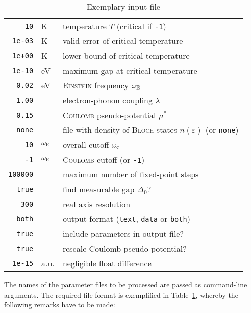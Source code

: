 \documentclass[twocolumn]{article}
\def\sub#1{\sb{\mathrm{#1}}}
\let\epsilon\varepsilon
\let\Delta\varDelta
\newlength\gap
\let\name\textsc
\begin{document}
   \begin{table}
      \centering
      \begin{tabular}{r @{\,} *2l}
         \verb|10| & K & temperature $T$ (critical if \verb|-1|) \\
         [\gap]
         \verb|1e-03| & K & valid error of critical temperature \\
         \verb|1e+00| & K & lower bound of critical temperature \\
         \verb|1e-10| & eV & maximum gap at critical temperature \\
         [\gap]
         \verb|0.02| & eV & \name{Einstein} frequency $\omega \sub E$ \\
         \verb|1.00| && electron-phonon coupling $\lambda$ \\
         \verb|0.15| && \name{Coulomb} pseudo-potential $\mu^*$ \\
         [\gap]
         \verb|none| && file with density of \name{Bloch} states $n(\epsilon)$
            (or \verb|none|) \\
         [\gap]
         \verb|10| & $\omega \sub E$ & overall cutoff $\omega \sub c$ \\
         \verb|-1| & $\omega \sub E$ & \name{Coulomb} cutoff (or \verb|-1|) \\
         [\gap]
         \verb|100000| && maximum number of fixed-point steps \\
         [\gap]
         \verb|true| && find measurable gap $\Delta_0$? \\
         \verb|300| && real axis resolution \\
         [\gap]
         \verb|both| && output format
            (\verb|text|, \verb|data| or \verb|both|) \\
         \verb|true| && include parameters in output file? \\
         [\gap]
         \verb|true| && rescale Coulomb pseudo-potential? \\
         [\gap]
         \verb|1e-15| & a.u. & negligible float difference
      \end{tabular}
      \caption{Exemplary input file}
      \label{input}
   \end{table}
   The names of  the parameter files to be processed  are passed as command-line
   arguments.  The required  file  format is  exemplified in  Table~\ref{input},
   whereby the following remarks have to be made:
\end{document}
